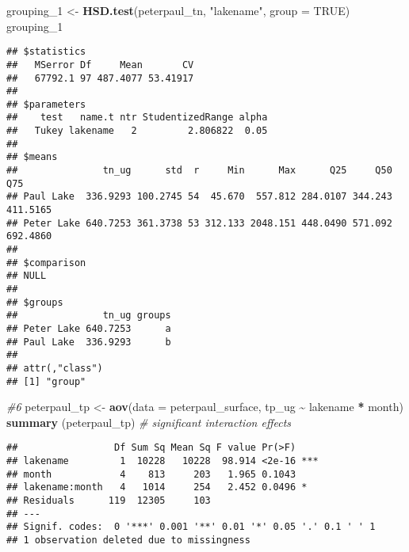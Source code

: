 \documentclass[
]{article}
\newenvironment{Shaded}{\begin{snugshade}}{\end{snugshade}}
\newcommand{\CommentTok}[1]{\textcolor[rgb]{0.56,0.35,0.01}{\textit{#1}}}
\newcommand{\DataTypeTok}[1]{\textcolor[rgb]{0.13,0.29,0.53}{#1}}
\newcommand{\DecValTok}[1]{\textcolor[rgb]{0.00,0.00,0.81}{#1}}
\newcommand{\KeywordTok}[1]{\textcolor[rgb]{0.13,0.29,0.53}{\textbf{#1}}}
\newcommand{\NormalTok}[1]{#1}
\newcommand{\OperatorTok}[1]{\textcolor[rgb]{0.81,0.36,0.00}{\textbf{#1}}}
\newcommand{\OtherTok}[1]{\textcolor[rgb]{0.56,0.35,0.01}{#1}}
\newcommand{\StringTok}[1]{\textcolor[rgb]{0.31,0.60,0.02}{#1}}
\begin{document}
\begin{Shaded}
\begin{Highlighting}[]
\NormalTok{grouping\_}\DecValTok{1}\NormalTok{ <{-}}\StringTok{ }\KeywordTok{HSD.test}\NormalTok{(peterpaul\_tn, }\StringTok{"lakename"}\NormalTok{, }\DataTypeTok{group =} \OtherTok{TRUE}\NormalTok{)}
\NormalTok{grouping\_}\DecValTok{1}
\end{Highlighting}
\end{Shaded}

\begin{verbatim}
## $statistics
##   MSerror Df     Mean       CV
##   67792.1 97 487.4077 53.41917
## 
## $parameters
##    test   name.t ntr StudentizedRange alpha
##   Tukey lakename   2         2.806822  0.05
## 
## $means
##               tn_ug      std  r     Min      Max      Q25     Q50      Q75
## Paul Lake  336.9293 100.2745 54  45.670  557.812 284.0107 344.243 411.5165
## Peter Lake 640.7253 361.3738 53 312.133 2048.151 448.0490 571.092 692.4860
## 
## $comparison
## NULL
## 
## $groups
##               tn_ug groups
## Peter Lake 640.7253      a
## Paul Lake  336.9293      b
## 
## attr(,"class")
## [1] "group"
\end{verbatim}

\begin{Shaded}
\begin{Highlighting}[]
\CommentTok{\#6}
\NormalTok{peterpaul\_tp <{-}}\StringTok{ }\KeywordTok{aov}\NormalTok{(}\DataTypeTok{data =}\NormalTok{ peterpaul\_surface, tp\_ug }\OperatorTok{\textasciitilde{}}\StringTok{ }\NormalTok{lakename }\OperatorTok{*}\StringTok{ }\NormalTok{month)}
\KeywordTok{summary}\NormalTok{ (peterpaul\_tp) }\CommentTok{\# significant interaction effects}
\end{Highlighting}
\end{Shaded}

\begin{verbatim}
##                 Df Sum Sq Mean Sq F value Pr(>F)    
## lakename         1  10228   10228  98.914 <2e-16 ***
## month            4    813     203   1.965 0.1043    
## lakename:month   4   1014     254   2.452 0.0496 *  
## Residuals      119  12305     103                   
## ---
## Signif. codes:  0 '***' 0.001 '**' 0.01 '*' 0.05 '.' 0.1 ' ' 1
## 1 observation deleted due to missingness
\end{verbatim}
\end{document}
